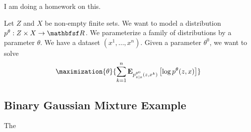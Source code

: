 
\sbasic















































\sstart
{}


I am doing a homework on this.


Let $Z$ and $X$ be non-empty finite sets.
We want to model a distribution
$p^\theta: Z \times X \to \R$.
We parameterize a family
of distributions by a parameter $\theta$.
We have a dataset $(x^1, \dots, x^n)$.
Given a parameter $\theta^0$, we want
to solve
\[
  \maximization{\theta}{\sum_{k = 1}^{n}
    \Expect_{p^{\theta^0}_{z \mid x}(z, x^k)}
    \left[
      \log p^{\theta}(z, x)
    \right]
  }
\]
\subsection{Binary Gaussian Mixture Example}
The

